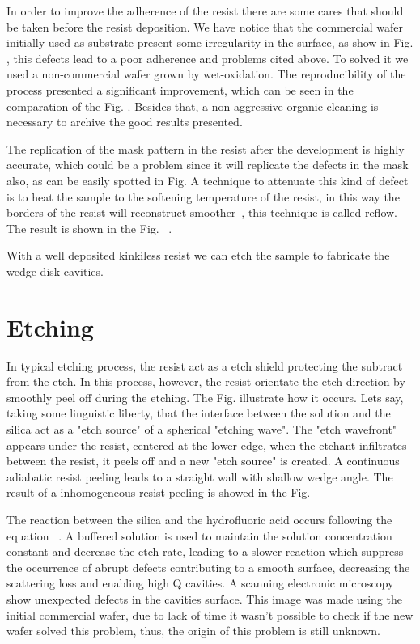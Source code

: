 In order to improve the adherence of the resist there are some cares that should be taken before the resist deposition. We have notice that the commercial wafer initially used as substrate present some irregularity in the surface, as show in Fig.%
, this defects lead to a poor adherence and problems cited above. To solved it we used a non-commercial wafer grown by wet-oxidation. The reproducibility of the process presented a significant improvement, which can be seen in the comparation of the Fig.%
. Besides that, a non aggressive organic cleaning is necessary to archive the good results presented.

The replication of the mask pattern in the resist after the development is highly accurate, which could be a problem since it will replicate the defects in the mask also, as can be easily spotted in Fig. A technique to attenuate this kind of defect is to heat the sample to the softening temperature of the resist, in this way the borders of the resist will reconstruct smoother~\needcit, this technique is called reflow. The result is shown in the Fig.~%
. 

With a well deposited kinkiless resist we can etch the sample to fabricate the wedge disk cavities. 

\section{Etching}

In typical etching process, the resist act as a etch shield protecting the subtract from the etch. In this process, however, the resist orientate the etch direction by smoothly peel off during the etching. The Fig. %
illustrate how it occurs. Lets say, taking some linguistic liberty, that the interface between the solution and the silica act as a "etch source" of a spherical "etching wave". The "etch wavefront" appears under the resist, centered at the lower edge, when the etchant infiltrates between the resist, it peels off and a new "etch source" is created. A continuous adiabatic resist peeling leads to a straight wall with shallow wedge angle. The result of a inhomogeneous resist peeling is showed in the Fig. 

The reaction between the silica and the hydrofluoric acid occurs following the equation~\cite{Kang_2002} 
.
A buffered solution is used to maintain the solution concentration constant and decrease the etch rate, leading to a slower reaction which suppress the occurrence of abrupt defects contributing to a smooth surface, decreasing the scattering loss and enabling high Q cavities. A scanning electronic microscopy show unexpected defects in the cavities surface. This image was made using the initial commercial wafer, due to lack of time it wasn't possible to check if the new wafer solved this problem, thus, the origin of this problem is still unknown.    

